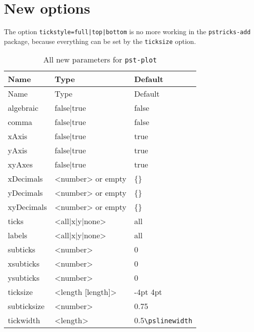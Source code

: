 \section{ New options}
The option \verb+tickstyle=full|top|bottom+ is no more working in the \verb+pstricks-add+
package, because everything can be set by the \verb+ticksize+ option.
{
\ttfamily
\begin{longtable}{lll}
\caption{All new parameters for \texttt{pst-plot}}\\[-5pt]
\textrm{Name}         & \textrm{Type}  & \textrm{Default}\\\hline
\endfirsthead
\textrm{Name}         & \textrm{Type}  & \textrm{Default}\\\hline
\endhead
algebraic             & false|true & false\\ %
comma                 & false|true & false\\ %
xAxis                 & false|true & true\\%
yAxis                 & false|true & true\\%
xyAxes                & false|true & true\\%
xDecimals            & <number> or empty  & \{\}\\%
yDecimals            & <number> or empty  & \{\}\\%
xyDecimals            & <number> or empty   & \{\}\\%
ticks                & <all|x|y|none>   & all\\%
labels               & <all|x|y|none>   & all\\%
subticks             & <number>         & 0\\
xsubticks            & <number>         & 0\\
ysubticks            & <number>         & 0\\
ticksize             & <length [length]>         & -4pt 4pt\\
subticksize          & <number>         & 0.75\\
tickwidth            & <length>         & 0.5\verb+\pslinewidth+\\

\end{longtable}}
